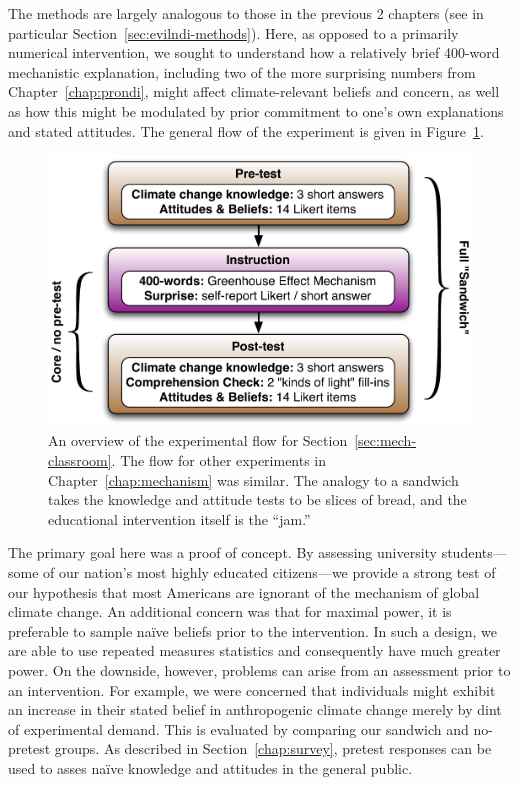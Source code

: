 The methods are largely analogous to those in the previous 2 chapters (see in
particular Section~\ref{sec:evilndi-methods}). Here, as opposed to a primarily
numerical intervention, we sought to understand how a
relatively brief 400-word mechanistic explanation, including two of the more
surprising numbers from Chapter~\ref{chap:prondi}, might affect climate-relevant
beliefs and concern,
as well as how this might be modulated by prior commitment to one's own
explanations and stated attitudes.  The general flow of the experiment is given
in Figure~\ref{fig:mech-flow}.

\begin{figure}[h]
    \includegraphics[width=6.5in]{mech-survey-flow1.pdf}
    \caption{An overview of the experimental flow for
        Section~\ref{sec:mech-classroom}. The flow for other experiments in
        Chapter~\ref{chap:mechanism} was similar. The analogy to a sandwich
        takes the knowledge and attitude tests to be slices of bread, and the
        educational intervention itself is the “jam.”}
    \label{fig:mech-flow}
\end{figure}

The primary goal here was a proof of concept. By assessing university
students---some of our nation’s most highly educated citizens---we provide a
strong test of our hypothesis that most Americans are ignorant of the mechanism
of global climate change. An additional concern was that for maximal power, it
is preferable to sample na\"ive beliefs prior to the intervention. In such a
design, we are able to use repeated measures statistics and consequently have
much greater power. On the downside, however, problems can arise from an
assessment prior to an intervention. For example, we were concerned that
individuals might exhibit an increase in their stated belief in anthropogenic
climate change merely by dint of experimental demand. This is evaluated by
comparing our sandwich and no-pretest groups.  As described in
Section~\ref{chap:survey}, pretest responses can be used to asses na\"ive
knowledge and attitudes in the general public. 

